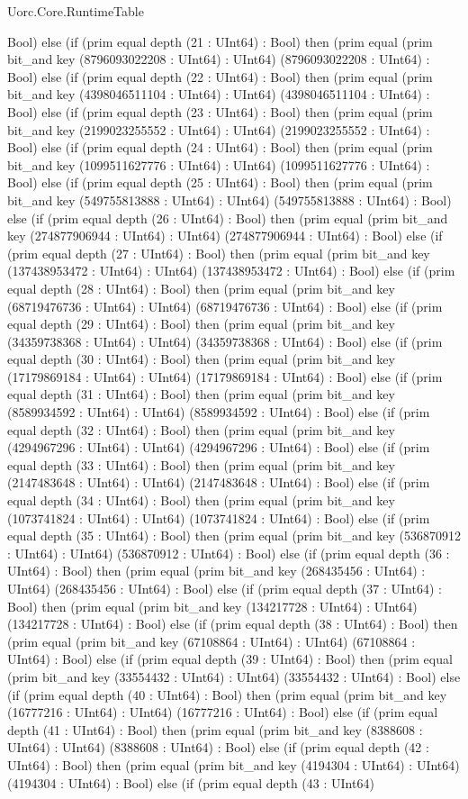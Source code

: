 \begin{lexlean}{Uorc.Core.RuntimeTable}
\begin{semanticmodule}
{Bool) else (if (prim equal depth (21 : UInt64) : Bool) then (prim equal (prim bit_and key (8796093022208 : UInt64) : UInt64) (8796093022208 : UInt64) : Bool) else (if (prim equal depth (22 : UInt64) : Bool) then (prim equal (prim bit_and key (4398046511104 : UInt64) : UInt64) (4398046511104 : UInt64) : Bool) else (if (prim equal depth (23 : UInt64) : Bool) then (prim equal (prim bit_and key (2199023255552 : UInt64) : UInt64) (2199023255552 : UInt64) : Bool) else (if (prim equal depth (24 : UInt64) : Bool) then (prim equal (prim bit_and key (1099511627776 : UInt64) : UInt64) (1099511627776 : UInt64) : Bool) else (if (prim equal depth (25 : UInt64) : Bool) then (prim equal (prim bit_and key (549755813888 : UInt64) : UInt64) (549755813888 : UInt64) : Bool) else (if (prim equal depth (26 : UInt64) : Bool) then (prim equal (prim bit_and key (274877906944 : UInt64) : UInt64) (274877906944 : UInt64) : Bool) else (if (prim equal depth (27 : UInt64) : Bool) then (prim equal (prim bit_and key (137438953472 : UInt64) : UInt64) (137438953472 : UInt64) : Bool) else (if (prim equal depth (28 : UInt64) : Bool) then (prim equal (prim bit_and key (68719476736 : UInt64) : UInt64) (68719476736 : UInt64) : Bool) else (if (prim equal depth (29 : UInt64) : Bool) then (prim equal (prim bit_and key (34359738368 : UInt64) : UInt64) (34359738368 : UInt64) : Bool) else (if (prim equal depth (30 : UInt64) : Bool) then (prim equal (prim bit_and key (17179869184 : UInt64) : UInt64) (17179869184 : UInt64) : Bool) else (if (prim equal depth (31 : UInt64) : Bool) then (prim equal (prim bit_and key (8589934592 : UInt64) : UInt64) (8589934592 : UInt64) : Bool) else (if (prim equal depth (32 : UInt64) : Bool) then (prim equal (prim bit_and key (4294967296 : UInt64) : UInt64) (4294967296 : UInt64) : Bool) else (if (prim equal depth (33 : UInt64) : Bool) then (prim equal (prim bit_and key (2147483648 : UInt64) : UInt64) (2147483648 : UInt64) : Bool) else (if (prim equal depth (34 : UInt64) : Bool) then (prim equal (prim bit_and key (1073741824 : UInt64) : UInt64) (1073741824 : UInt64) : Bool) else (if (prim equal depth (35 : UInt64) : Bool) then (prim equal (prim bit_and key (536870912 : UInt64) : UInt64) (536870912 : UInt64) : Bool) else (if (prim equal depth (36 : UInt64) : Bool) then (prim equal (prim bit_and key (268435456 : UInt64) : UInt64) (268435456 : UInt64) : Bool) else (if (prim equal depth (37 : UInt64) : Bool) then (prim equal (prim bit_and key (134217728 : UInt64) : UInt64) (134217728 : UInt64) : Bool) else (if (prim equal depth (38 : UInt64) : Bool) then (prim equal (prim bit_and key (67108864 : UInt64) : UInt64) (67108864 : UInt64) : Bool) else (if (prim equal depth (39 : UInt64) : Bool) then (prim equal (prim bit_and key (33554432 : UInt64) : UInt64) (33554432 : UInt64) : Bool) else (if (prim equal depth (40 : UInt64) : Bool) then (prim equal (prim bit_and key (16777216 : UInt64) : UInt64) (16777216 : UInt64) : Bool) else (if (prim equal depth (41 : UInt64) : Bool) then (prim equal (prim bit_and key (8388608 : UInt64) : UInt64) (8388608 : UInt64) : Bool) else (if (prim equal depth (42 : UInt64) : Bool) then (prim equal (prim bit_and key (4194304 : UInt64) : UInt64) (4194304 : UInt64) : Bool) else (if (prim equal depth (43 : UInt64) }
\end{semanticmodule}
\end{lexlean}
